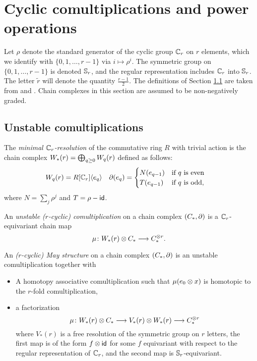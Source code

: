 \section{Cyclic comultiplications and power operations}\label{s:2bcomultiplications}

Let $\rho$ denote the standard generator of the cyclic group $\Cyc_r$ on $r$ elements, which we identify with $\{0,1,\ldots,r-1\}$ via $i\mapsto \rho^i$. The symmetric group on $\{0,1,\ldots,r-1\}$ is denoted $\Sym_r$, and the regular representation includes $\Cyc_r$ into $\Sym_r$. The letter $\tilde{r}$ will denote the quantity $\frac{r-1}{2}$. The definitions of Section \ref{s:unstable} are taken from \cite{may1970general} and \cite{medina2021may_st}. Chain complexes in this section are assumed to be non-negatively graded.

\subsection{Unstable comultiplications}\label{s:unstable}

The \emph{minimal $\Cyc_r$-resolution} of the commutative ring $R$ with trivial action is the chain complex $\W(r) = \bigoplus_{q\geq 0} \W[q](r)$ defined as follows:
\begin{align*}
	\W[q](r) &= R[\Cyc_r]\langle e_q\rangle  &
	\partial(e_q) &= \begin{cases}
		N(e_{q-1}) & \text{if $q$ is even} \\
		T(e_{q-1}) & \text{if $q$ is odd,}
	\end{cases}
\end{align*}
where $N = \sum_j \rho^j$ and $T = \rho - \Id$.

\begin{definition} An \emph{unstable ($r$-cyclic) comultiplication} on a chain complex $(\ucadenas,\partial)$ is a $\Cyc_r$-equivariant chain map
\[\mu \colon  \W(r) \ot  \ucadenas\lra \ucadenas^{ \ot  r}.\]
\end{definition}

\begin{definition}
	An \emph{($r$-cyclic) May structure} on a chain complex $(\ucadenas,\partial)$ is an unstable comultiplication together with
	\begin{itemize}
		\item A homotopy associative comultiplication such that $\mu(e_0 \ot  x)$ is homotopic to the $r$-fold comultiplication,
		\item a factorization
	\[
		\mu \colon  \W(r) \ot  \ucadenas\lra V_*(r) \ot  \W(r)\lra  \ucadenas^{ \ot  r}
	\]
where $V_*(r)$ is a free resolution of the symmetric group on $r$ letters, the first map is of the form $f \ot  \id$ for some $f$ equivariant with respect to the regular representation of $\Cyc_r$, and the second map is $\Sym_r$-equivariant.
	\end{itemize}
\end{definition}



